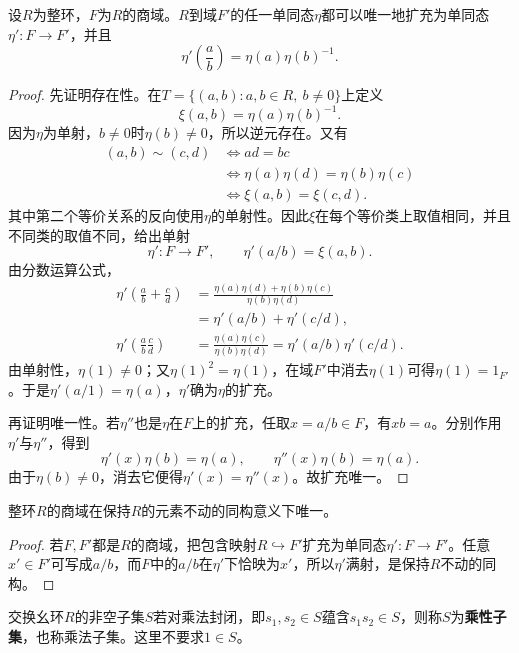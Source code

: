 \begin{theorem}\label{p2:fraction-field-extension}
设$R$为整环，$F$为$R$的商域。$R$到域$F'$的任一单同态$\eta$都可以唯一地扩充为单同态$\eta':F\to F'$，并且
\[
\eta'\left(\frac ab\right)=\eta(a)\eta(b)^{-1}.
\]
\end{theorem}
\begin{proof}
先证明存在性。在$T=\{(a,b):a,b\in R,\ b\ne0\}$上定义
\[
\xi(a,b)=\eta(a)\eta(b)^{-1}.
\]
因为$\eta$为单射，$b\ne0$时$\eta(b)\ne0$，所以逆元存在。又有
\begin{align*}
(a,b)\sim(c,d)
&\Longleftrightarrow ad=bc\\
&\Longleftrightarrow \eta(a)\eta(d)=\eta(b)\eta(c)\\
&\Longleftrightarrow \xi(a,b)=\xi(c,d).
\end{align*}
其中第二个等价关系的反向使用$\eta$的单射性。因此$\xi$在每个等价类上取值相同，并且不同类的取值不同，给出单射
\[
\eta':F\to F',\qquad \eta'(a/b)=\xi(a,b).
\]
由分数运算公式，
\begin{align*}
\eta'\left(\frac ab+\frac cd\right)
&=\frac{\eta(a)\eta(d)+\eta(b)\eta(c)}{\eta(b)\eta(d)}\\
&=\eta'(a/b)+\eta'(c/d),\\
\eta'\left(\frac ab\frac cd\right)
&=\frac{\eta(a)\eta(c)}{\eta(b)\eta(d)}
=\eta'(a/b)\eta'(c/d).
\end{align*}
由单射性，$\eta(1)\ne0$；又$\eta(1)^2=\eta(1)$，在域$F'$中消去$\eta(1)$可得$\eta(1)=1_{F'}$。于是$\eta'(a/1)=\eta(a)$，$\eta'$确为$\eta$的扩充。

再证明唯一性。若$\eta''$也是$\eta$在$F$上的扩充，任取$x=a/b\in F$，有$xb=a$。分别作用$\eta'$与$\eta''$，得到
\[
\eta'(x)\eta(b)=\eta(a),\qquad
\eta''(x)\eta(b)=\eta(a).
\]
由于$\eta(b)\ne0$，消去它便得$\eta'(x)=\eta''(x)$。故扩充唯一。
\end{proof}

\begin{corollary}
整环$R$的商域在保持$R$的元素不动的同构意义下唯一。
\end{corollary}
\begin{proof}
若$F,F'$都是$R$的商域，把包含映射$R\hookrightarrow F'$扩充为单同态$\eta':F\to F'$。任意$x'\in F'$可写成$a/b$，而$F$中的$a/b$在$\eta'$下恰映为$x'$，所以$\eta'$满射，是保持$R$不动的同构。
\end{proof}

\begin{definition}
交换幺环$R$的非空子集$S$若对乘法封闭，即$s_1,s_2\in S$蕴含$s_1s_2\in S$，则称$S$为\textbf{乘性子集}，也称乘法子集。这里不要求$1\in S$。
\end{definition}

